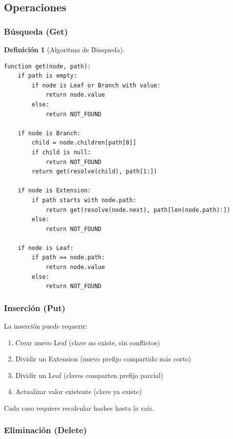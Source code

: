 \documentclass[11pt,a4paper,twoside,openright]{book}
\theoremstyle{definition}
\newtheorem{definition}{Definición}[chapter]
\theoremstyle{plain}
\theoremstyle{remark}
\begin{document}
\subsection{Operaciones}

\subsubsection{Búsqueda (Get)}

\begin{definition}[Algoritmo de Búsqueda]
\begin{verbatim}
function get(node, path):
    if path is empty:
        if node is Leaf or Branch with value:
            return node.value
        else:
            return NOT_FOUND
    
    if node is Branch:
        child = node.children[path[0]]
        if child is null:
            return NOT_FOUND
        return get(resolve(child), path[1:])
    
    if node is Extension:
        if path starts with node.path:
            return get(resolve(node.next), path[len(node.path):])
        else:
            return NOT_FOUND
    
    if node is Leaf:
        if path == node.path:
            return node.value
        else:
            return NOT_FOUND
\end{verbatim}
\end{definition}

\subsubsection{Inserción (Put)}

\begin{mathnote}
La inserción puede requerir:
\begin{enumerate}
    \item Crear nuevo Leaf (clave no existe, sin conflictos)
    \item Dividir un Extension (nuevo prefijo compartido más corto)
    \item Dividir un Leaf (claves comparten prefijo parcial)
    \item Actualizar valor existente (clave ya existe)
\end{enumerate}

Cada caso requiere recalcular hashes hasta la raíz.
\end{mathnote}

\subsubsection{Eliminación (Delete)}
\end{document}

